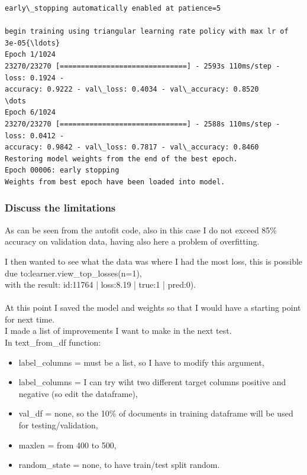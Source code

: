  \begin{Verbatim}[commandchars=\\\{\},fontsize=\footnotesize]
early\_stopping automatically enabled at patience=5

begin training using triangular learning rate policy with max lr of 3e-05{\ldots}
Epoch 1/1024
23270/23270 [==============================] - 2593s 110ms/step - loss: 0.1924 -
accuracy: 0.9222 - val\_loss: 0.4034 - val\_accuracy: 0.8520
\dots
Epoch 6/1024
23270/23270 [==============================] - 2588s 110ms/step - loss: 0.0412 -
accuracy: 0.9842 - val\_loss: 0.7817 - val\_accuracy: 0.8460
Restoring model weights from the end of the best epoch.
Epoch 00006: early stopping
Weights from best epoch have been loaded into model.
    \end{Verbatim}

\subsubsection{Discuss the limitations} 
As can be seen from the autofit code, also in this case I do not exceed 85\% \gls{accuracy} on validation data, having also here a problem of overfitting.

I then wanted to see what the data was where I had the most loss, this is possible due to:learner.view\_top\_losses(n=1),\\
with the result: id:11764 | loss:8.19 | true:1 | pred:0).\\
\\
At this point I saved the model and weights so that I would have a starting point for next time.\\
I made a list of improvements I want to make in the next test.\\
In text\_from\_df function:
\begin{itemize}
    \item label\_columns = must be a list, so I have to modify this argument,
    \item label\_columns = I can try wiht two different target columns positive and negative (so edit the dataframe),
    \item val\_df = none, so the 10\% of documents in training dataframe will be used for testing/validation,
    \item maxlen = from 400 to 500,
    \item random\_state = none, to have train/test split random.
\end{itemize}


